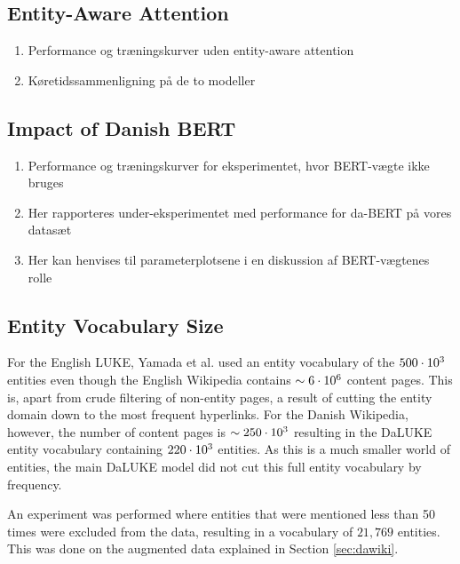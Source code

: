 \documentclass[main.tex]{subfiles}
\begin{document}
\subsection{Entity-Aware Attention}
\begin{enumerate}
    \item Performance og træningskurver uden entity-aware attention
    \item Køretidssammenligning på de to modeller
\end{enumerate}

\subsection{Impact of Danish BERT}
\begin{enumerate}
    \item Performance og træningskurver for eksperimentet, hvor BERT-vægte ikke bruges
    \item Her rapporteres under-eksperimentet med performance for da-BERT på vores datasæt
    \item Her kan henvises til parameterplotsene i en diskussion af BERT-vægtenes rolle
\end{enumerate}

\subsection{Entity Vocabulary Size}
For the English LUKE, Yamada et al. used an entity vocabulary of the $500\cdot10^{3}$ entities \cite[Sec. 3.4]{yamada2020luke} even though the English Wikipedia contains $\sim 6\cdot10^{6}$ content pages\footnotemark.
This is, apart from crude filtering of non-entity pages, a result of cutting the entity domain down to the most frequent hyperlinks.
For the Danish Wikipedia, however, the number of content pages is $\sim 250\cdot10^{3}$ \footnotemark resulting in the DaLUKE entity vocabulary containing $220\cdot10^{3}$ entities.
As this is a much smaller world of entities, the main DaLUKE model did not cut this full entity vocabulary by frequency.

An experiment was performed where entities that were mentioned less than 50 times were excluded from the data, resulting in a vocabulary of $21,769$ entities.
This was done on the augmented data explained in Section \ref{sec:dawiki}.
\end{document}
